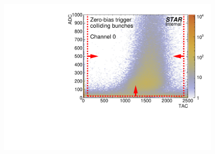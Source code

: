 \begin{figure}[hb]
{  \includegraphics[width=\linewidth,page=3]{graphics/eventSelection/bbc/Bbc_ADCvsTAC_collidingBunches.pdf}
}%
\end{figure}
